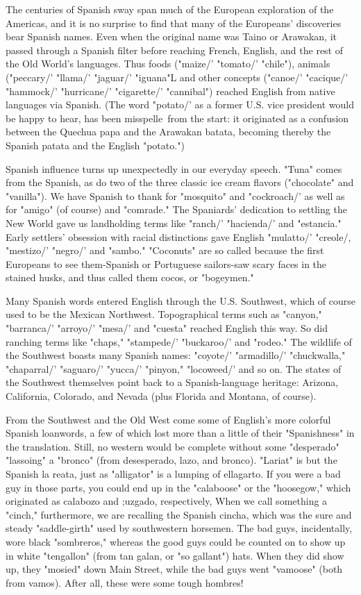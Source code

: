 The centuries of Spanish sway span much of the European
exploration of the Americas, and it is no surprise to find that many of the
Europeans' discoveries bear Spanish names. Even when the original
name was Taino or Arawakan, it passed through a Spanish filter before
reaching French, English, and the rest of the Old World's languages.
Thus foods ("maize/' "tomato/' "chile"), animals ("peccary/' "llama/'
"jaguar/' "iguana"L and other concepts ("canoe/' "cacique/' "hammock/' "hurricane/' "cigarette/' "cannibal") reached English from native languages via Spanish. (The word "potato/' as a former U.S. vice
president would be happy to hear, has been misspelle~from the start:
it originated as a confusion between the Quechua papa and the Arawakan batata, becoming thereby the Spanish patata and the English
"potato.")

Spanish influence turns up unexpectedly in our everyday
speech. "Tuna" comes from the Spanish, as do two of the three classic
ice cream flavors ("chocolate" and "vanilla"). We have Spanish to
thank for "mosquito" and "cockroach/' as well as for "amigo" (of
course) and "comrade." The Spaniards' dedication to settling the New
World gave us landholding terms like "ranch/' "hacienda/' and "estancia." Early settlers' obsession with racial distinctions gave English
"mulatto/' "creole/, "mestizo/' "negro/' and "sambo." "Coconuts" are
so called because the first Europeans to see them-Spanish or Portuguese sailors-saw scary faces in the stained husks, and thus called
them cocos, or "bogeymen."

Many Spanish words entered English through the U.S. Southwest, which of course used to be the Mexican Northwest. Topographical terms such as "canyon," "barranca/' "arroyo/' "mesa/' and "cuesta"
reached English this way. So did ranching terms like "chaps," "stampede/' "buckaroo/' and "rodeo." The wildlife of the Southwest boasts
many Spanish names: "coyote/' "armadillo/' "chuckwalla," "chaparral/' "saguaro/' "yucca/' "pinyon," "locoweed/' and so on. The states
of the Southwest themselves point back to a Spanish-language heritage: Arizona, California, Colorado, and Nevada (plus Florida and Montana, of course).

From the Southwest and the Old West come some of English's
more colorful Spanish loanwords, a few of which lost more than a
little of their "Spanishness" in the translation. Still, no western would
be complete without some "desperado" "lassoing" a "bronco" (from
desesperado, lazo, and bronco). "Lariat" is but the Spanish la reata,
just as "alligator" is a lumping of ellagarto. If you were a bad guy in
those parts, you could end up in the "calaboose" or the "hoosegow,"
which originated as calabozo and ;uzgado, respectively, When we
call something a "cinch," furthermore, we are recalling the Spanish
cincha, which was the sure and steady "saddle-girth" used by southwestern horsemen. The bad guys, incidentally, wore black "sombreros,"
whereas the good guys could be counted on to show up in white "tengallon" (from tan galan, or "so gallant") hats. When they did show up,
they "mosied" down Main Street, while the bad guys went "vamoose"
(both from vamos). After all, these were some tough hombres!

